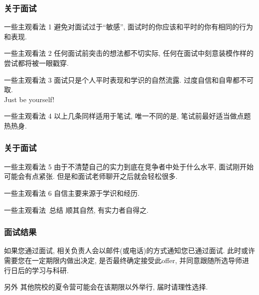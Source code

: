 \documentclass[usenames,dvipsnames]{beamer}
\begin{document}
    \begin{frame}
      \frametitle{关于面试}
      \small
      \begin{block}{一些主观看法 1}
        避免对面试过于``敏感'', 面试时的你应该和平时的你有相同的行为和表现.
      \end{block}
      \begin{alertblock}{一些主观看法 2}
        任何面试前突击的想法都不切实际, 任何在面试中刻意装模作样的尝试都将被一眼戳穿.
      \end{alertblock}
      \begin{block}{一些主观看法 3}
        面试只是个人平时表现和学识的自然流露. 过度自信和自卑都不可取. \\
        Just be yourself!
      \end{block}
      \begin{block}{一些主观看法 4}
        以上几条同样适用于笔试, 唯一不同的是, 笔试前最好适当做点题热热身.
      \end{block}

    \end{frame}

    \begin{frame}
      \frametitle{关于面试}
      \begin{block}{一些主观看法 5}
        由于不清楚自己的实力到底在竞争者中处于什么水平, 面试刚开始可能会有点紧张. 但是和面试老师聊开之后就会轻松很多.
      \end{block}

      \begin{block}{一些主观看法 6}
        自信主要来源于学识和经历.
      \end{block}

      \begin{block}{一些主观看法\  总结}
        顺其自然, 有实力者自得之.
      \end{block}
    \end{frame}

    \begin{frame}
      \frametitle{面试结果}
      如果您通过面试, 相关负责人会以邮件(或电话)的方式通知您已通过面试. 此时或许需要您在一定期限内做出决定, 是否最终确定接受此offer, 并同意跟随所选导师进行日后的学习与科研. 
      
      \begin{block}{另外}
        其他院校的夏令营可能会在该期限以外举行, 届时请理性选择.
      \end{block} 
    \end{frame}
\end{document}
